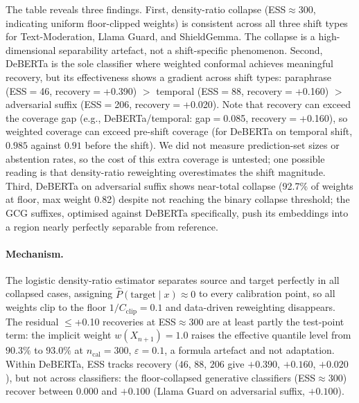\documentclass{article}
\begin{document}
The table reveals three findings. First, density-ratio collapse (ESS${\approx}$300, indicating uniform floor-clipped weights) is consistent across all three shift types for Text-Moderation, Llama Guard, and ShieldGemma. The collapse is a high-dimensional separability artefact, not a shift-specific phenomenon. Second, DeBERTa is the sole classifier where weighted conformal achieves meaningful recovery, but its effectiveness shows a gradient across shift types: paraphrase (ESS${=}$46, recovery${=}$+0.390) $>$ temporal (ESS${=}$88, recovery${=}$+0.160) $>$ adversarial suffix (ESS${=}$206, recovery${=}$+0.020). Note that recovery can exceed the coverage gap (e.g., DeBERTa/temporal: gap${=}$0.085, recovery${=}$+0.160), so weighted coverage can exceed pre-shift coverage (for DeBERTa on temporal shift, $0.985$ against $0.91$ before the shift). We did not measure prediction-set sizes or abstention rates, so the cost of this extra coverage is untested; one possible reading is that density-ratio reweighting overestimates the shift magnitude. Third, DeBERTa on adversarial suffix shows near-total collapse (92.7\% of weights at floor, max weight 0.82) despite not reaching the binary collapse threshold; the GCG suffixes, optimised against DeBERTa specifically, push its embeddings into a region nearly perfectly separable from reference.

\paragraph{Mechanism.} The logistic density-ratio estimator separates source and target perfectly in all collapsed cases, assigning $\hat{P}(\text{target} \mid x) \approx 0$ to every calibration point, so all weights clip to the floor $1/C_{\text{clip}} = 0.1$ and data-driven reweighting disappears. The residual $\leq$+0.10 recoveries at ESS$\approx$300 are at least partly the test-point term: the implicit weight $w(X_{n+1})=1.0$ raises the effective quantile level from $90.3\%$ to $93.0\%$ at $n_{\text{cal}}=300$, $\varepsilon=0.1$, a formula artefact and not adaptation. Within DeBERTa, ESS tracks recovery ($46$, $88$, $206$ give $+0.390$, $+0.160$, $+0.020$), but not across classifiers: the floor-collapsed generative classifiers (ESS${\approx}$300) recover between $0.000$ and $+0.100$ (Llama Guard on adversarial suffix, $+0.100$).
\end{document}
